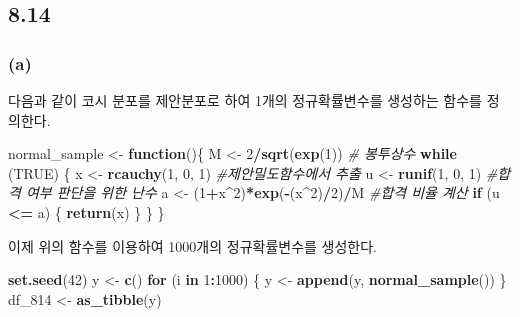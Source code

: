 \documentclass[
]{article}
\newenvironment{Shaded}{\begin{snugshade}}{\end{snugshade}}
\newcommand{\CommentTok}[1]{\textcolor[rgb]{0.56,0.35,0.01}{\textit{#1}}}
\newcommand{\ConstantTok}[1]{\textcolor[rgb]{0.56,0.35,0.01}{#1}}
\newcommand{\ControlFlowTok}[1]{\textcolor[rgb]{0.13,0.29,0.53}{\textbf{#1}}}
\newcommand{\DecValTok}[1]{\textcolor[rgb]{0.00,0.00,0.81}{#1}}
\newcommand{\FunctionTok}[1]{\textcolor[rgb]{0.13,0.29,0.53}{\textbf{#1}}}
\newcommand{\NormalTok}[1]{#1}
\newcommand{\OtherTok}[1]{\textcolor[rgb]{0.56,0.35,0.01}{#1}}
\newcommand{\SpecialCharTok}[1]{\textcolor[rgb]{0.81,0.36,0.00}{\textbf{#1}}}
\begin{document}
\subsection{8.14}\label{section-7}

\subsubsection{(a)}\label{a-3}

다음과 같이 코시 분포를 제안분포로 하여 1개의 정규확률변수를 생성하는
함수를 정의한다.

\begin{Shaded}
\begin{Highlighting}[]
\NormalTok{normal\_sample }\OtherTok{\textless{}{-}} \ControlFlowTok{function}\NormalTok{()\{}
\NormalTok{  M }\OtherTok{\textless{}{-}} \DecValTok{2}\SpecialCharTok{/}\FunctionTok{sqrt}\NormalTok{(}\FunctionTok{exp}\NormalTok{(}\DecValTok{1}\NormalTok{)) }\CommentTok{\# 봉투상수}
  \ControlFlowTok{while}\NormalTok{ (}\ConstantTok{TRUE}\NormalTok{) \{}
\NormalTok{    x }\OtherTok{\textless{}{-}} \FunctionTok{rcauchy}\NormalTok{(}\DecValTok{1}\NormalTok{, }\DecValTok{0}\NormalTok{, }\DecValTok{1}\NormalTok{) }\CommentTok{\#제안밀도함수에서 추출 }
\NormalTok{    u }\OtherTok{\textless{}{-}} \FunctionTok{runif}\NormalTok{(}\DecValTok{1}\NormalTok{, }\DecValTok{0}\NormalTok{, }\DecValTok{1}\NormalTok{) }\CommentTok{\#합격 여부 판단을 위한 난수}
\NormalTok{    a }\OtherTok{\textless{}{-}}\NormalTok{ (}\DecValTok{1}\SpecialCharTok{+}\NormalTok{x}\SpecialCharTok{\^{}}\DecValTok{2}\NormalTok{)}\SpecialCharTok{*}\FunctionTok{exp}\NormalTok{(}\SpecialCharTok{{-}}\NormalTok{(x}\SpecialCharTok{\^{}}\DecValTok{2}\NormalTok{)}\SpecialCharTok{/}\DecValTok{2}\NormalTok{)}\SpecialCharTok{/}\NormalTok{M }\CommentTok{\#합격 비율 계산}
    \ControlFlowTok{if}\NormalTok{ (u }\SpecialCharTok{\textless{}=}\NormalTok{ a) \{}
      \FunctionTok{return}\NormalTok{(x)}
\NormalTok{    \}}
\NormalTok{  \}}
\NormalTok{\}}
\end{Highlighting}
\end{Shaded}

이제 위의 함수를 이용하여 1000개의 정규확률변수를 생성한다.

\begin{Shaded}
\begin{Highlighting}[]
\FunctionTok{set.seed}\NormalTok{(}\DecValTok{42}\NormalTok{)}
\NormalTok{y }\OtherTok{\textless{}{-}} \FunctionTok{c}\NormalTok{()}
\ControlFlowTok{for}\NormalTok{ (i }\ControlFlowTok{in} \DecValTok{1}\SpecialCharTok{:}\DecValTok{1000}\NormalTok{) \{}
\NormalTok{  y }\OtherTok{\textless{}{-}} \FunctionTok{append}\NormalTok{(y, }\FunctionTok{normal\_sample}\NormalTok{())}
\NormalTok{\}}
\NormalTok{df\_814 }\OtherTok{\textless{}{-}} \FunctionTok{as\_tibble}\NormalTok{(y)}
\end{Highlighting}
\end{Shaded}
\end{document}
